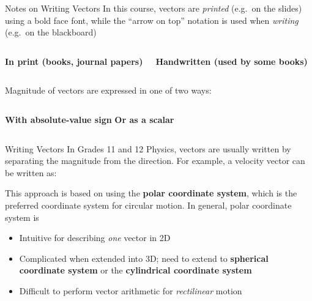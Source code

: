 \documentclass[12pt,compress,aspectratio=169]{beamer}
\newcommand{\mb}[1]{\ensuremath\mathbf{#1}}
\newcommand{\eq}[2]{\vspace{#1}{\Large\begin{displaymath}#2\end{displaymath}}}
\begin{document}
\begin{frame}{Notes on  Writing Vectors}
  In this course, vectors are \emph{printed} (e.g.\ on the slides) using a bold
  face font, while the ``arrow on top'' notation is used when \emph{writing}
  (e.g.\ on the blackboard)
  \vspace{.1in}
  \begin{columns}
    \textbf{In print (books, journal papers)}
    \vspace{-.2in}{\LARGE
      \begin{displaymath}
        \mb{v}\quad\mb{F}_g\quad\mb{p}\quad\mb{I}
      \end{displaymath}
    }
    
    \textbf{Handwritten (used by some books)}
  \end{columns}
  Magnitude of vectors are expressed in one of two ways:
  \vspace{.1in}
  \begin{columns}
    \textbf{With absolute-value sign}
    \vspace{-.2in}{\LARGE
      \begin{displaymath}
        |\mb{v}|\quad|\mb{F}_g|\quad|\mb{p}|\quad|\mb{I}|
      \end{displaymath}
    }
    \textbf{Or as a scalar}
      \vspace{-.2in}{\LARGE
        \begin{displaymath}
          v\quad F_g\quad p \quad I
        \end{displaymath}
      }
  \end{columns}
\end{frame}


\begin{frame}{Writing Vectors}
  In Grades 11 and 12 Physics, vectors are usually written by separating the
  magnitude from the direction. For example, a velocity vector can be written
  as:
  
  \eq{-.2in}{
    \mb{v}=\SI{4.5}{\metre\per\second}\text{ [N $55^\circ$ E]}
  }
  
  \vspace{-.15in}This approach is based on using the
  \textbf{polar coordinate system}, which is the preferred coordinate system
  for circular motion. In general, polar coordinate system is
  \begin{itemize}
  \item Intuitive for describing \emph{one} vector in 2D
  \item Complicated when extended into 3D; need to extend to
    \textbf{spherical coordinate system} or the
    \textbf{cylindrical coordinate system}
  \item Difficult to perform vector arithmetic for \emph{rectilinear} motion
  \end{itemize}
\end{frame}
\end{document}
